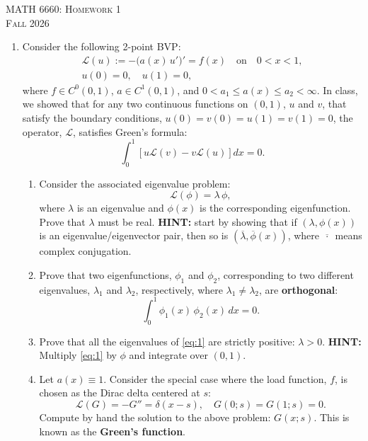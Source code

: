 \documentclass[11pt,leqno]{article}
\newcommand{\LL}{\mathcal{L}}
\begin{document}
\begin{center}
  {\large\textsc{MATH 6660: Homework 1}}\\
  {\large\textsc{Fall 2026}}
\end{center}

\begin{enumerate}

\item Consider the following 2-point BVP:
\begin{gather*}
  \LL\left(u\right) := -\bigl(a(x)\,u'\bigr)' = f(x) \quad \text{on} \quad 0<x<1,\\
  u(0) = 0, \quad u(1) = 0,
\end{gather*}
where $f\in C^{0}(0,1)$, $a\in C^{1}(0,1)$, and $0<a_{1}\le a(x)\le a_{2}<\infty$.
In class, we showed that for any two continuous functions on $(0,1)$, $u$ and
$v$, that satisfy the boundary conditions, $u(0)=v(0)=u(1)=v(1)=0$, the
operator, $\LL$, satisfies Green's formula:
\[
  \int_{0}^{1}\left[u\LL\left(v\right)-v\LL\left(u\right)\right]dx = 0.
\]

\begin{enumerate}

\item Consider the associated eigenvalue problem:
\begin{equation}\label{eq:1}
  \LL\left(\phi\right) = \lambda\,\phi,
\end{equation}
where $\lambda$ is an eigenvalue and $\phi(x)$ is the corresponding
eigenfunction. Prove that $\lambda$ must be real.
\textbf{HINT:} start by showing that if $(\lambda,\phi(x))$ is an
eigenvalue/eigenvector pair, then so is
$(\overline{\lambda},\overline{\phi}(x))$, where $\overline{\,\cdot\,}$ means
complex conjugation.

\item Prove that two eigenfunctions, $\phi_{1}$ and $\phi_{2}$, corresponding to
two different eigenvalues, $\lambda_{1}$ and $\lambda_{2}$, respectively, where
$\lambda_{1}\neq\lambda_{2}$, are \textbf{orthogonal}:
\[
  \int_{0}^{1}\phi_{1}(x)\,\phi_{2}(x)\,dx = 0.
\]

\item Prove that all the eigenvalues of \eqref{eq:1} are strictly positive:
$\lambda>0$. \textbf{HINT:} Multiply \eqref{eq:1} by $\phi$ and integrate over
$(0,1)$.

\item Let $a(x)\equiv1$. Consider the special case where the load function, $f$,
is chosen as the Dirac delta centered at $s$:
\[
  \LL\left(G\right) = -G'' = \delta\left(x-s\right), \quad G(0;s)=G(1;s)=0.
\]
Compute by hand the solution to the above problem: $G(x;s)$. This is known as
the \textbf{Green's function}.


\end{enumerate}
\end{enumerate}
\end{document}
